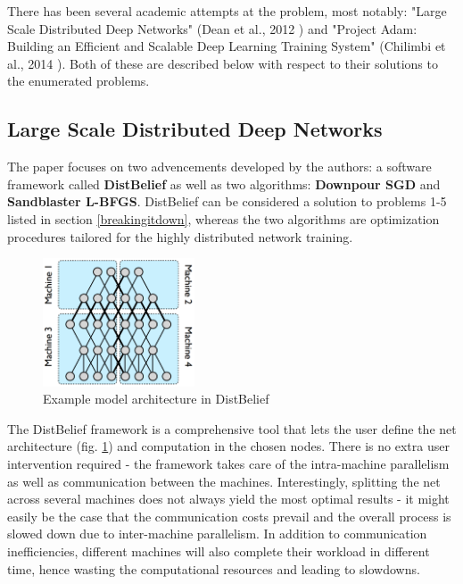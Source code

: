 \documentclass[a4paper, 12pt]{article}
\numberwithin{equation}{section}
\begin{document}
	There has been several academic attempts at the problem, most notably: "Large Scale Distributed Deep Networks" (Dean et al., 2012 \cite{dean2012large}) and "Project Adam: Building an Efficient and Scalable Deep Learning Training System" (Chilimbi et al., 2014 \cite{chilimbi2014project}). Both of these are described below with respect to their solutions to the enumerated problems.
	
	\subsection{Large Scale Distributed Deep Networks}
	
	The paper focuses on two advencements developed by the authors: a software framework called \textbf{DistBelief} as well as two algorithms: \textbf{Downpour SGD} and \textbf{Sandblaster L-BFGS}. DistBelief can be considered a solution to problems 1-5 listed in section \ref{breakingitdown}, whereas the two algorithms are optimization procedures tailored for the highly distributed network training.
	
	\begin{figure}[H]
		\centering
		\includegraphics[width=0.40\textwidth]{distbelief.png}
		\caption{\label{fig:distbelief}Example model architecture in DistBelief \cite{dean2012large}}
	\end{figure}
	
	The DistBelief framework is a comprehensive tool that lets the user define the net architecture (fig. \ref{fig:distbelief}) and computation in the chosen nodes. There is no extra user intervention required - the framework takes care of the intra-machine parallelism as well as communication between the machines. Interestingly, splitting the net across several machines does not always yield the most optimal results - it might easily be the case that the communication costs prevail and the overall process is slowed down due to inter-machine parallelism. In addition to communication inefficiencies, different machines will also complete their workload in different time, hence wasting the computational resources and leading to slowdowns.
	
\end{document}
